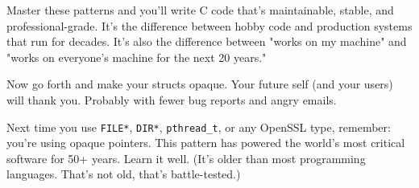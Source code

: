 Master these patterns and you'll write C code that's maintainable, stable, and professional-grade. It's the difference between hobby code and production systems that run for decades. It's also the difference between "works on my machine" and "works on everyone's machine for the next 20 years."

\vspace{1em}

Now go forth and make your structs opaque. Your future self (and your users) will thank you. Probably with fewer bug reports and angry emails.

\begin{tipbox}
Next time you use \texttt{FILE*}, \texttt{DIR*}, \texttt{pthread\_t}, or any OpenSSL type, remember: you're using opaque pointers. This pattern has powered the world's most critical software for 50+ years. Learn it well. (It's older than most programming languages. That's not old, that's battle-tested.)
\end{tipbox}

